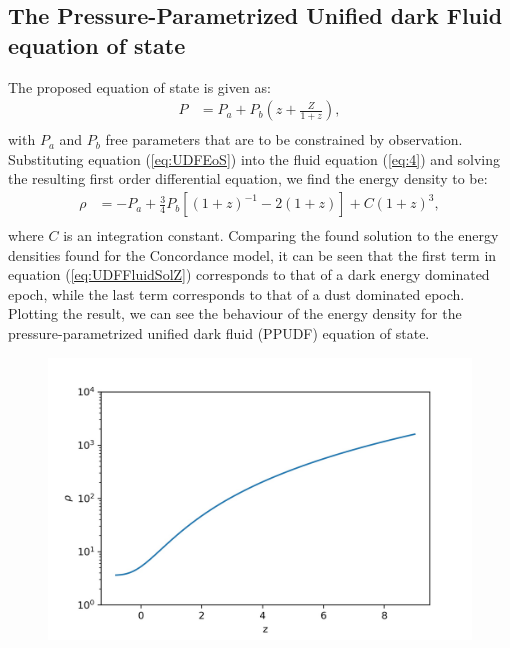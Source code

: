 \documentclass[a0,portrait]{a0poster}
\newcommand{\brac}[1]{\left(#1\right)}
\newcommand{\bracc}[1]{\left[#1\right]}
\renewcommand{\baselinestretch}{0.85}
\begin{document}
\begin{multicols}{2}
\section*{The Pressure-Parametrized Unified dark Fluid equation of state}
The proposed equation of state is given as:
\begin{equation}\label{eq:UDFEoS}
\begin{split}
P &= P_{a}+P_{b}\brac{z+\frac{Z}{1+z}},         \\
\end{split}
\end{equation}
with $P_{a}$ and $P_{b}$ free parameters that are to be constrained by observation.
Substituting equation (\ref{eq:UDFEoS}) into the fluid equation (\ref{eq:4}) and solving the resulting first order differential equation, we find the energy density to be:
\begin{equation}\label{eq:UDFFluidSolZ}
\begin{split}
\rho&= -P_{a}+\frac{3}{4}P_{b}\bracc{\brac{1+z}^{-1}-2\brac{1+z}}+C\brac{1+z}^{3}, \\
\end{split}
\end{equation}
where $C$ is an integration constant. Comparing the found solution to the energy densities found for the Concordance model, it can be seen that the first term in equation (\ref{eq:UDFFluidSolZ}) corresponds to that of a dark energy dominated epoch, while the last term corresponds to that of a dust dominated epoch. Plotting the result, we can see the behaviour of the energy density for the pressure-parametrized unified dark fluid (PPUDF) equation of state.
\noindent
\begin{minipage}{.24\textwidth}
\begin{figure}[H]
\centering
\renewcommand{\baselinestretch}{0.5}
\includegraphics[scale=1]{Figures/UDF_rho.jpg}

\end{figure}
\end{minipage}
\end{multicols}
\end{document}
